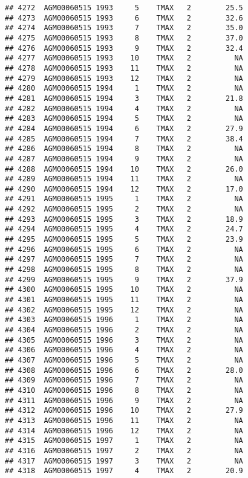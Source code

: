 \documentclass{article}\usepackage[]{graphicx}\usepackage[]{color}
\makeatletter
\newenvironment{kframe}{%
 \def\at@end@of@kframe{}%
 \ifinner\ifhmode%
  \def\at@end@of@kframe{\end{minipage}}%
  \begin{minipage}{\columnwidth}%
 \fi\fi%
 \def\FrameCommand##1{\hskip\@totalleftmargin \hskip-\fboxsep
 \colorbox{shadecolor}{##1}\hskip-\fboxsep
     \hskip-\linewidth \hskip-\@totalleftmargin \hskip\columnwidth}%
 \MakeFramed {\advance\hsize-\width
   \@totalleftmargin\z@ \linewidth\hsize
   \@setminipage}}%
 {\par\unskip\endMakeFramed%
 \at@end@of@kframe}
\newenvironment{knitrout}{}{} %
\makeatother
\begin{document}
\begin{knitrout}
\begin{kframe}
\begin{verbatim}
## 4272  AGM00060515 1993     5    TMAX   2        25.5
## 4273  AGM00060515 1993     6    TMAX   2        32.6
## 4274  AGM00060515 1993     7    TMAX   2        35.0
## 4275  AGM00060515 1993     8    TMAX   2        37.0
## 4276  AGM00060515 1993     9    TMAX   2        32.4
## 4277  AGM00060515 1993    10    TMAX   2          NA
## 4278  AGM00060515 1993    11    TMAX   2          NA
## 4279  AGM00060515 1993    12    TMAX   2          NA
## 4280  AGM00060515 1994     1    TMAX   2          NA
## 4281  AGM00060515 1994     3    TMAX   2        21.8
## 4282  AGM00060515 1994     4    TMAX   2          NA
## 4283  AGM00060515 1994     5    TMAX   2          NA
## 4284  AGM00060515 1994     6    TMAX   2        27.9
## 4285  AGM00060515 1994     7    TMAX   2        38.4
## 4286  AGM00060515 1994     8    TMAX   2          NA
## 4287  AGM00060515 1994     9    TMAX   2          NA
## 4288  AGM00060515 1994    10    TMAX   2        26.0
## 4289  AGM00060515 1994    11    TMAX   2          NA
## 4290  AGM00060515 1994    12    TMAX   2        17.0
## 4291  AGM00060515 1995     1    TMAX   2          NA
## 4292  AGM00060515 1995     2    TMAX   2          NA
## 4293  AGM00060515 1995     3    TMAX   2        18.9
## 4294  AGM00060515 1995     4    TMAX   2        24.7
## 4295  AGM00060515 1995     5    TMAX   2        23.9
## 4296  AGM00060515 1995     6    TMAX   2          NA
## 4297  AGM00060515 1995     7    TMAX   2          NA
## 4298  AGM00060515 1995     8    TMAX   2          NA
## 4299  AGM00060515 1995     9    TMAX   2        37.9
## 4300  AGM00060515 1995    10    TMAX   2          NA
## 4301  AGM00060515 1995    11    TMAX   2          NA
## 4302  AGM00060515 1995    12    TMAX   2          NA
## 4303  AGM00060515 1996     1    TMAX   2          NA
## 4304  AGM00060515 1996     2    TMAX   2          NA
## 4305  AGM00060515 1996     3    TMAX   2          NA
## 4306  AGM00060515 1996     4    TMAX   2          NA
## 4307  AGM00060515 1996     5    TMAX   2          NA
## 4308  AGM00060515 1996     6    TMAX   2        28.0
## 4309  AGM00060515 1996     7    TMAX   2          NA
## 4310  AGM00060515 1996     8    TMAX   2          NA
## 4311  AGM00060515 1996     9    TMAX   2          NA
## 4312  AGM00060515 1996    10    TMAX   2        27.9
## 4313  AGM00060515 1996    11    TMAX   2          NA
## 4314  AGM00060515 1996    12    TMAX   2          NA
## 4315  AGM00060515 1997     1    TMAX   2          NA
## 4316  AGM00060515 1997     2    TMAX   2          NA
## 4317  AGM00060515 1997     3    TMAX   2          NA
## 4318  AGM00060515 1997     4    TMAX   2        20.9

\end{verbatim}
\end{kframe}
\end{knitrout}
\end{document}
